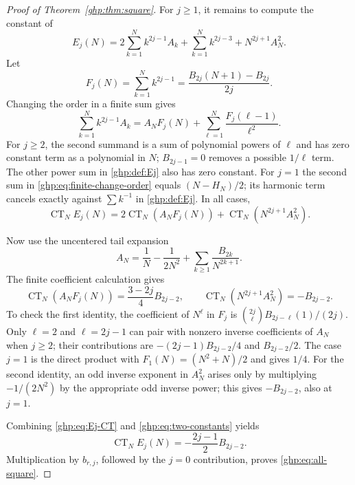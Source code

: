 \documentclass[11pt,a4paper]{article}
\numberwithin{equation}{section}
\theoremstyle{definition}
\theoremstyle{remark}
\begin{document}
\begin{proof}[Proof of Theorem~\ref{ghp:thm:square}]
For $j\geq1$, it remains to compute the constant of
\begin{equation}\label{ghp:def:Ej}
 E_j(N)=2\sum_{k=1}^Nk^{2j-1}A_k
        +\sum_{k=1}^Nk^{2j-3}+N^{2j+1}A_N^2.
\end{equation}
Let
\[
 F_j(N)=\sum_{k=1}^Nk^{2j-1}
       =\frac{B_{2j}(N+1)-B_{2j}}{2j}.
\]
Changing the order in a finite sum gives
\begin{equation}\label{ghp:eq:finite-change-order}
 \sum_{k=1}^Nk^{2j-1}A_k
  =A_NF_j(N)+\sum_{\ell=1}^N\frac{F_j(\ell-1)}{\ell^2}.
\end{equation}
For $j\geq2$, the second summand is a sum of polynomial powers of
$\ell$ and has zero constant term as a polynomial in $N$;
$B_{2j-1}=0$ removes a possible $1/\ell$ term. The other power sum in
\eqref{ghp:def:Ej} also has zero constant. For $j=1$ the second sum in
\eqref{ghp:eq:finite-change-order} equals $(N-H_N)/2$; its harmonic
term cancels exactly against $\sum k^{-1}$ in \eqref{ghp:def:Ej}.
In all cases,
\begin{equation}\label{ghp:eq:Ej-CT}
 \operatorname{CT}_NE_j(N)
   =2\operatorname{CT}_N(A_NF_j(N))
          +\operatorname{CT}_N(N^{2j+1}A_N^2).
\end{equation}

Now use the uncentered tail expansion
\[
 A_N=\frac1N-\frac1{2N^2}
                  +\sum_{k\geq1}\frac{B_{2k}}{N^{2k+1}}.
\]
The finite coefficient calculation gives
\begin{equation}\label{ghp:eq:two-constants}
 \operatorname{CT}_N(A_NF_j(N))
      =\frac{3-2j}{4}B_{2j-2},\qquad
 \operatorname{CT}_N(N^{2j+1}A_N^2)=-B_{2j-2}.
\end{equation}
To check the first identity, the coefficient of $N^\ell$ in $F_j$
is $\binom{2j}{\ell}B_{2j-\ell}(1)/(2j)$. Only $\ell=2$ and
$\ell=2j-1$ can pair with nonzero inverse coefficients of $A_N$
when $j\geq2$; their contributions are
$-(2j-1)B_{2j-2}/4$ and $B_{2j-2}/2$. The case $j=1$ is the direct
product with $F_1(N)=(N^2+N)/2$ and gives $1/4$.
For the second identity, an odd inverse exponent in $A_N^2$ arises
only by multiplying $-1/(2N^2)$ by the appropriate odd inverse power;
this gives $-B_{2j-2}$, also at $j=1$.

Combining \eqref{ghp:eq:Ej-CT} and \eqref{ghp:eq:two-constants} yields
\[
 \operatorname{CT}_NE_j(N)=-\frac{2j-1}{2}B_{2j-2}.
\]
Multiplication by $b_{r,j}$, followed by the $j=0$ contribution,
proves \eqref{ghp:eq:all-square}.
\end{proof}
\end{document}
